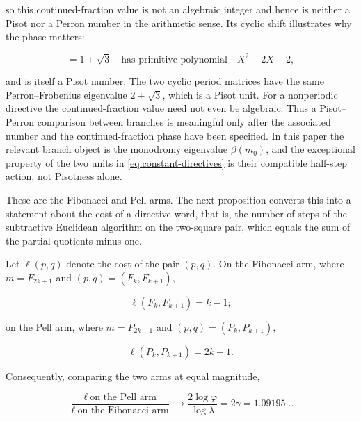 so this continued-fraction value is not an algebraic integer and hence is
neither a Pisot nor a Perron number in the arithmetic sense. Its cyclic shift
illustrates why the phase matters:

\begin{equation}
 [\overline{2,1}]=1+\sqrt3
 \quad\text{has primitive polynomial}\quad
 X^2-2X-2,
 \label{eq:periodic-cf-cyclic-shift}
\end{equation}

and is itself a Pisot number. The two cyclic period matrices have the same
Perron--Frobenius eigenvalue $2+\sqrt3$, which is a Pisot unit. For a
nonperiodic directive the continued-fraction value need not even be algebraic.
Thus a Pisot--Perron comparison between branches is meaningful only after the
associated number and the continued-fraction phase have been specified. In
this paper the relevant branch object is the monodromy eigenvalue
$\beta(m_0)$, and the exceptional property of the two units in
\cref{eq:constant-directives} is their compatible half-step action, not
Pisotness alone.

These are the Fibonacci and Pell arms. The next proposition converts this
into a statement about the cost of a directive word, that is, the number of
steps of the subtractive Euclidean algorithm on the two-square pair, which
equals the sum of the partial quotients minus one.

\begin{proposition}
\label{prop:arm-costs}
Let $\ell(p,q)$ denote the cost of the pair $(p,q)$. On the Fibonacci arm,
where $m=F_{2k+1}$ and $(p,q)=(F_k,F_{k+1})$,

\begin{equation}
 \ell(F_k,F_{k+1})=k-1;
\end{equation}

on the Pell arm, where $m=P_{2k+1}$ and $(p,q)=(P_k,P_{k+1})$,

\begin{equation}
 \ell(P_k,P_{k+1})=2k-1.
\end{equation}

Consequently, comparing the two arms at equal magnitude,

\begin{equation}
 \frac{\ell\ \text{on the Pell arm}}{\ell\ \text{on the Fibonacci arm}}
 \longrightarrow
 \frac{2\log\varphi}{\log\lambda}
 =2\gamma
 =1.09195\ldots
 \label{eq:cost-ratio}
\end{equation}
\end{proposition}


